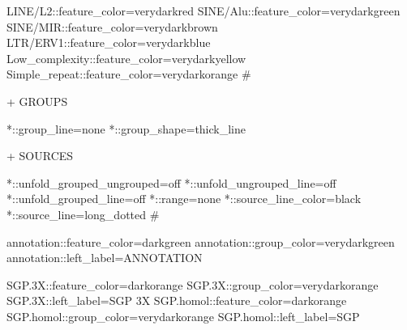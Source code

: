 \documentclass[11pt]{article}
\def\nwendcode{\endtrivlist \endgroup} %
\let\nwdocspar=\par                    %
\begin{document}
\nwenddocs{}\endmoddef
LINE/L2::feature_color=verydarkred
SINE/Alu::feature_color=verydarkgreen
SINE/MIR::feature_color=verydarkbrown
LTR/ERV1::feature_color=verydarkblue
Low_complexity::feature_color=verydarkyellow
Simple_repeat::feature_color=verydarkorange
#
\nwendcode{}\nwdocspar

+ GROUPS

\nwenddocs{}\endmoddef
*::group_line=none
*::group_shape=thick_line
\nwendcode{}\nwdocspar

+ SOURCES

\nwenddocs{}\endmoddef
*::unfold_grouped_ungrouped=off
*::unfold_ungrouped_line=off
*::unfold_grouped_line=off
*::range=none
*::source_line_color=black
*::source_line=long_dotted
#
\nwendcode{}\nwdocspar
 
\nwenddocs{}\endmoddef
annotation::feature_color=darkgreen
annotation::group_color=verydarkgreen
annotation::left_label=ANNOTATION
\nwendcode{}\nwdocspar

\nwenddocs{}\endmoddef
SGP.3X::feature_color=darkorange
SGP.3X::group_color=verydarkorange
SGP.3X::left_label=SGP 3X
SGP.homol::feature_color=darkorange
SGP.homol::group_color=verydarkorange
SGP.homol::left_label=SGP
\nwendcode{}\nwdocspar
\end{document}
